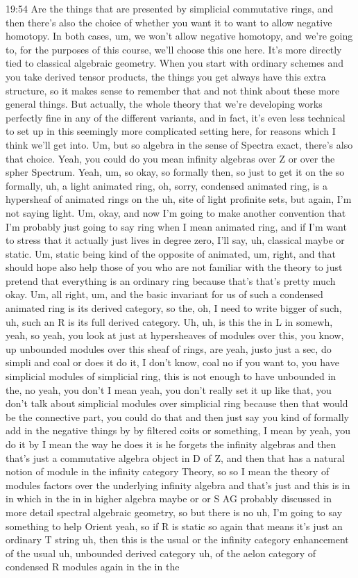 \begin{unfinished}{19:54}
Are the things that are presented by simplicial commutative rings, and then there's also the choice of whether you want it to want to allow negative homotopy. In both cases, um, we won't allow negative homotopy, and we're going to, for the purposes of this course, we'll choose this one here. It's more directly tied to classical algebraic geometry. When you start with ordinary schemes and you take derived tensor products, the things you get always have this extra structure, so it makes sense to remember that and not think about these more general things. But actually, the whole theory that we're developing works perfectly fine in any of the different variants, and in fact, it's even less technical to set up in this seemingly more complicated setting here, for reasons which I think we'll get into. Um, but so algebra in the sense of Spectra exact, there's also that choice. Yeah, you could do you mean infinity algebras over Z or over the spher Spectrum. Yeah, um, so okay, so formally then, so just to get it on the so formally, uh, a light animated ring, oh, sorry, condensed animated ring, is a hypersheaf of animated rings on the uh, site of light profinite sets, but again, I'm not saying light. Um, okay, and now I'm going to make another convention that I'm probably just going to say ring when I mean animated ring, and if I'm want to stress that it actually just lives in degree zero, I'll say, uh, classical maybe or static. Um, static being kind of the opposite of animated, um, right, and that should hope also help those of you who are not familiar with the theory to just pretend that everything is an ordinary ring because that's that's pretty much okay. Um, all right, um, and the basic invariant for us of such a condensed animated ring is its derived category, so the, oh, I need to write bigger of such, uh, such an R is its full derived category. Uh, uh, is this the in L in somewh, yeah, so yeah, you look at just at hypersheaves of modules over this, you know, up unbounded modules over this sheaf of rings, are yeah, justo just a sec, do simpli and coal or does it do it, I don't know, coal no if you want to, you have simplicial modules of simplicial ring, this is not enough to have unbounded in the, no yeah, you don't I mean yeah, you don't really set it up like that, you don't talk about simplicial modules over simplicial ring because then that would be the connective part, you could do that and then just say you kind of formally add in the negative things by by filtered coits or something, I mean by yeah, you do it by I mean the way he does it is he forgets the infinity algebras and then that's just a commutative algebra object in D of Z, and then that has a natural notion of module in the infinity category Theory, so so I mean the theory of modules factors over the underlying infinity algebra and that's just and this is in in which in the in in higher algebra maybe or or S AG probably discussed in more detail spectral algebraic geometry, so but there is no uh, I'm going to say something to help Orient yeah, so if R is static so again that means it's just an ordinary T string uh, then this is the usual or the infinity category enhancement of the usual uh, unbounded derived category uh, of the aelon category of condensed R modules again in the in the 
\end{unfinished}
